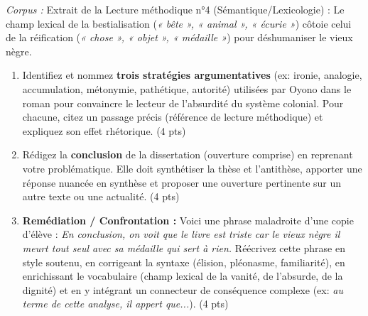 \documentclass[11pt]{article}
\begin{document}
\begin{exercice}
\emph{Corpus :} Extrait de la Lecture méthodique n°4 (Sémantique/Lexicologie) : \og Le champ lexical de la bestialisation (\textit{« bête », « animal », « écurie »}) côtoie celui de la réification (\textit{« chose », « objet », « médaille »}) pour déshumaniser le vieux nègre. \fg{}

\begin{enumerate}
    \item Identifiez et nommez \textbf{trois stratégies argumentatives} (ex: ironie, analogie, accumulation, métonymie, pathétique, autorité) utilisées par Oyono dans le roman pour convaincre le lecteur de l'absurdité du système colonial. Pour chacune, citez un passage précis (référence de lecture méthodique) et expliquez son effet rhétorique. (4 pts)
    \item Rédigez la \textbf{conclusion} de la dissertation (ouverture comprise) en reprenant votre problématique. Elle doit synthétiser la thèse et l'antithèse, apporter une réponse nuancée en synthèse et proposer une ouverture pertinente sur un autre texte ou une actualité. (4 pts)
    \item \textbf{Remédiation / Confrontation :} Voici une phrase maladroite d'une copie d'élève : \og \textit{En conclusion, on voit que le livre est triste car le vieux nègre il meurt tout seul avec sa médaille qui sert à rien.} \fg{}
    Réécrivez cette phrase en style soutenu, en corrigeant la syntaxe (élision, pléonasme, familiarité), en enrichissant le vocabulaire (champ lexical de la vanité, de l'absurde, de la dignité) et en y intégrant un connecteur de conséquence complexe (ex: \textit{au terme de cette analyse, il appert que...}). (4 pts)
\end{enumerate}
\end{exercice}
\end{document}

